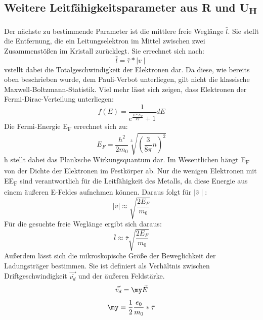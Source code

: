 \documentclass[titlepage=firstcover, captions=tableheading]{scrartcl}
\begin{document}
\subsection{Weitere Leitfähigkeitsparameter aus R und U\textsubscript{H}}
Der nächste zu bestimmende Parameter ist die mittlere freie Weglänge $\bar{l}$. Sie stellt die Entfernung, die ein Leitungselektron im Mittel zwischen zwei Zusammenstößen im Kristall zurücklegt. Sie errechnet sich nach:
\begin{equation}
    \bar{l}=\bar{\tau}*\mid v\mid
\end{equation}
\mid v\mid stellt dabei die Totalgeschwindigkeit der Elektronen dar. Da diese, wie bereits oben beschrieben wurde, dem Pauli-Verbot unterliegen, gilt nicht die klassische Maxwell-Boltzmann-Statistik. Viel mehr lässt sich zeigen, dass Elektronen der Fermi-Dirac-Verteilung unterliegen:
\begin{equation}
    f(E)=\frac{1}{e^\frac{E*E_F}{kT}+1}dE
\end{equation}
Die Fermi-Energie E\textsubscript{F} errechnet sich zu:
\begin{equation}
    E_F=\frac{h^2}{2m_0}\sqrt[3]{(\frac{3}{8\pi}n)^2}
\end{equation}
h stellt dabei das Planksche Wirkungsquantum dar. Im Wesentlichen hängt E\textsubscript{F} von der Dichte der Elektronen im Festkörper ab. Nur die wenigen Elektronen mit E\approx E\textsubscript{F} sind verantwortlich für die Leitfähigkeit des Metalls, da diese Energie aus einem äußeren E-Feldes aufnehmen können. Daraus folgt für $\mid \bar{v} \mid$:
\begin{equation}
    \mid \bar{v} \mid\approx \sqrt{\frac{2E_F}{m_0}}
\end{equation}
Für die gesuchte freie Weglänge ergibt sich daraus:
\begin{equation}
    \bar{l}\approx\bar{\tau}\sqrt{\frac{2E_F}{m_0}}
\end{equation}
Außerdem lässt sich die mikroskopische Größe der Beweglichkeit \my der Ladungsträger bestimmen. Sie ist definiert als Verhältnis zwischen Driftgeschwindigkeit $\vec{\bar{v_d}}$ und der äußeren Feldstärke.
\begin{equation}
    \vec{\bar{v_d}}=\my\vec{E}
\end{equation}
\begin{equation}
    \my=\frac{1}{2}\frac{e_0}{m_0}*\bar{\tau}
\end{equation}
\end{document}
